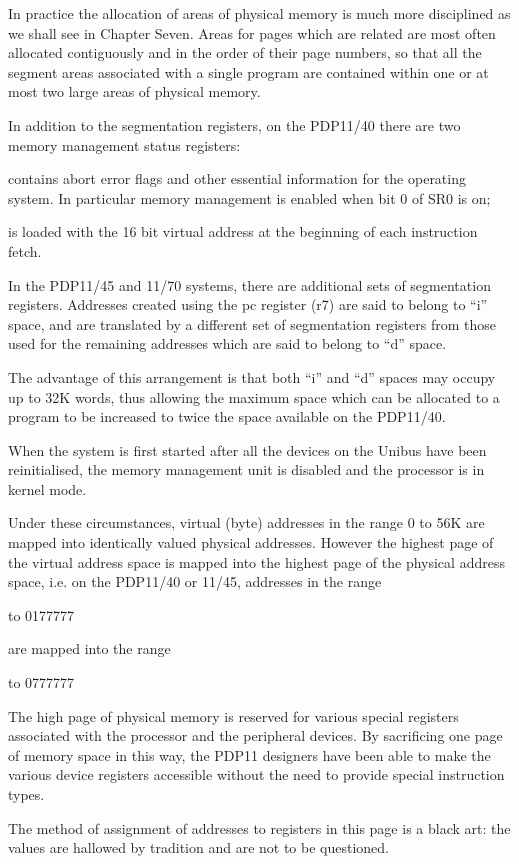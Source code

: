 In practice the allocation of areas of
physical memory is much more disciplined
as we shall see in Chapter Seven.
Areas for pages which are related are
most often allocated contiguously and
in the order of their page numbers, so
that all the segment areas associated
with a single program are contained
within one or at most two large areas
of physical memory.



In addition to the segmentation registers,
on the PDP11/40 there are two
memory management status registers:

\bd
\item[SR0] contains abort error flags and
other essential information for
the operating system. In particular
memory management is enabled
when bit 0 of SR0 is on;

\item[SR2] is loaded with the 16 bit virtual
address at the beginning of
each instruction fetch.
\ed



In the PDP11/45 and 11/70 systems,
there are additional sets of segmentation
registers. Addresses created using
the pc register (r7) are said to belong
to ``i'' space, and are translated by a
different set of segmentation registers
from those used for the remaining
addresses which are said to belong to
``d'' space.

The advantage of this arrangement is
that both ``i'' and ``d'' spaces may occupy
up to 32K words, thus allowing the maximum
space which can be allocated to a
program to be increased to twice the
space available on the PDP11/40.



When the system is first started after
all the devices on the Unibus have been
reinitialised, the memory management
unit is disabled and the processor is
in kernel mode.

Under these circumstances, virtual
(byte) addresses in the range 0 to 56K
are mapped into identically valued
physical addresses. However the highest
page of the virtual address space is
mapped into the highest page of the
physical address space, i.e. on the
PDP11/40 or 11/45, addresses in the
range

 to 0177777
\ec

\noindent are mapped into the range

 to 0777777
\ec



The high page of physical memory is
reserved for various special registers
associated with the processor and the
peripheral devices. By sacrificing one
page of memory space in this way, the
PDP11 designers have been able to make
the various device registers accessible
without the need to provide special
instruction types.

The method of assignment of addresses
to registers in this page is a black
art: the values are hallowed by tradition
and are not to be questioned.
